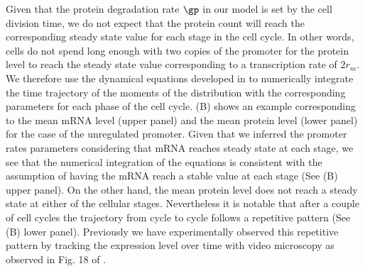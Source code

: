 Given that the protein degradation rate $\gp$ in our model is set by the cell
division time, we do not expect that the protein count will reach the
corresponding steady state value for each stage in the cell cycle. In other
words, cells do not spend long enough with two copies of the promoter for the
protein level to reach the steady state value corresponding to a transcription
rate of $2 r_m$. We therefore use the dynamical equations developed in
 to numerically integrate the time trajectory of the
moments of the distribution with the corresponding parameters for each phase of
the cell cycle. (B) shows an example corresponding to the
mean mRNA level (upper panel) and the mean protein level (lower panel) for the
case of the unregulated promoter. Given that we inferred the promoter rates
parameters considering that mRNA reaches steady state at each stage, we see
that the numerical integration of the equations is consistent with the
assumption of having the mRNA reach a stable value at each stage (See
(B) upper panel). On the other hand, the mean protein
level does not reach a steady state at either of the cellular stages.
Nevertheless it is notable that after a couple of cell cycles the trajectory
from cycle to cycle follows a repetitive pattern (See (B)
lower panel). Previously we have experimentally observed this repetitive
pattern by tracking the expression level over time with video microscopy as
observed in Fig. 18 of \cite{Phillips2019}.

